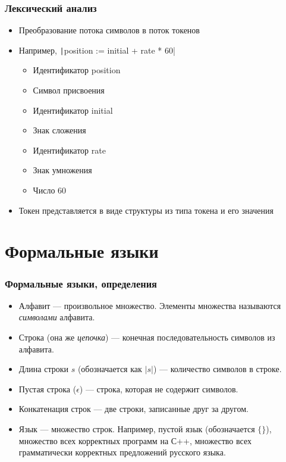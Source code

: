 \documentclass[xetex,mathserif,serif]{beamer}
\begin{document}
    \begin{frame}
        \frametitle{Лексический анализ}
        \begin{itemize}
            \item Преобразование потока символов в поток токенов
            \item Например, \texttt|position := initial + rate * 60|
            \begin{itemize}
                \item Идентификатор position
                \item Символ присвоения
                \item Идентификатор initial
                \item Знак сложения
                \item Идентификатор rate
                \item Знак умножения
                \item Число 60
            \end{itemize}
            \item Токен представляется в виде структуры из типа токена и его значения
        \end{itemize}
    \end{frame}

    \section{Формальные языки}

    \begin{frame}
        \frametitle{Формальные языки, определения}
        \begin{itemize}
            \item Алфавит --- произвольное множество. Элементы множества называются \textit{символами} алфавита.
            \item Строка (она же \textit{цепочка}) --- конечная последовательность символов из алфавита.
            \item Длина строки $s$ (обозначается как $\lvert{s}\rvert$) --- количество символов в строке.
            \item Пустая строка ($\epsilon$) --- строка, которая не содержит символов.
            \item Конкатенация строк --- две строки, записанные друг за другом.
            \item Язык --- множество строк. Например, пустой язык (обозначается $\{\}$), множество всех корректных 
                программ на С++, множество всех грамматически корректных предложений русского языка.
        \end{itemize}
    \end{frame}
\end{document}
